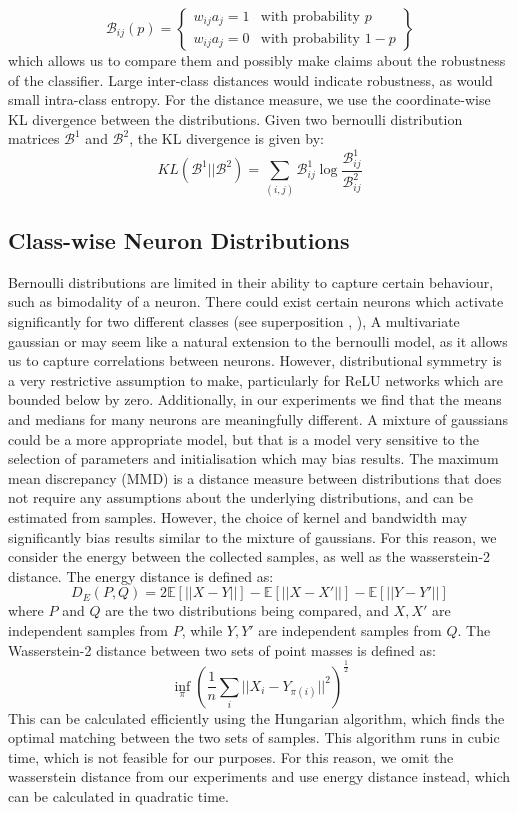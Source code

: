 \documentclass{article}
\begin{document}
            \[\mathcal{B}_{ij}(p) = \left \{ \begin{array}{ll}
                w_{ij}a_{j} = 1 & \text{with probability } p \\
                w_{ij}a_{j} = 0 & \text{with probability } 1-p
            \end{array} \right \} \]
            which allows us to compare them and possibly make claims about the robustness of the classifier. Large inter-class distances would indicate robustness, as would small intra-class entropy. For the distance measure, we use the coordinate-wise KL divergence between the distributions. Given two bernoulli distribution matrices $\mathcal{B}^{1}$ and $\mathcal{B}^{2}$, the KL divergence is given by:
            \[ KL(\mathcal{B}^{1} || \mathcal{B}^{2}) = \sum_{(i, j)} \mathcal{B}_{ij}^{1} \log \frac{\mathcal{B}_{ij}^{1}}{\mathcal{B}_{ij}^{2}} \]
        \subsection{Class-wise Neuron Distributions}
            Bernoulli distributions are limited in their ability to capture certain behaviour, such as bimodality of a neuron. There could exist certain neurons which activate significantly for two different classes (see superposition \cite{elhage2022superposition}, \cite{bricken2023monosemanticity}), 
            A multivariate gaussian or may seem like a natural extension to the bernoulli model, as it allows us to capture correlations between neurons. However, distributional symmetry is a very restrictive assumption to make, particularly for ReLU networks which are bounded below by zero. Additionally, in our experiments we find that the means and medians for many neurons are meaningfully different. A mixture of gaussians could be a more appropriate model, but that is a model very sensitive to the selection of parameters and initialisation which may bias results. The maximum mean discrepancy (MMD) is a distance measure between distributions that does not require any assumptions about the underlying distributions, and can be estimated from samples. However, the choice of kernel and bandwidth may significantly bias results similar to the mixture of gaussians. For this reason, we consider the energy between the collected samples, as well as the wasserstein-2 distance. The energy distance is defined as:
            \[D_{E}(P, Q) = 2 \mathbb{E}[||X - Y||] - \mathbb{E}[||X - X'||] - \mathbb{E}[||Y - Y'||]\]
            where $P$ and $Q$ are the two distributions being compared, and $X, X'$ are independent samples from $P$, while $Y, Y'$ are independent samples from $Q$. The Wasserstein-2 distance between two sets of point masses is defined as:
            \[\inf_{\pi} (\frac{1}{n}\sum_{i}||X_{i} - Y_{\pi(i)}||^2)^\frac{1}{2}\] 
            This can be calculated efficiently using the Hungarian algorithm, which finds the optimal matching between the two sets of samples. This algorithm runs in cubic time, which is not feasible for our purposes. For this reason, we omit the wasserstein distance from our experiments and use energy distance instead, which can be calculated in quadratic time.
\end{document}
